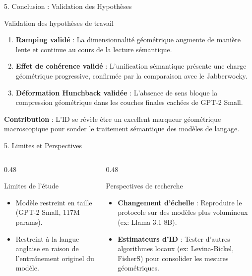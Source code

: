 \documentclass[t, aspectratio=169]{beamer}
\begin{document}
\begin{frame}{5. Conclusion : Validation des Hypothèses}
  \begin{block}{Validation des hypothèses de travail}
    \small
    \begin{enumerate}
      \item \textbf{Ramping validé} : La dimensionnalité géométrique augmente de manière lente et continue au cours de la lecture sémantique.
      \item \textbf{Effet de cohérence validé} : L'unification sémantique présente une charge géométrique progressive, confirmée par la comparaison avec le Jabberwocky.
      \item \textbf{Déformation Hunchback validée} : L'absence de sens bloque la compression géométrique dans les couches finales cachées de GPT-2 Small.
    \end{enumerate}
  \end{block}
  \vspace{0.2cm}
  \begin{center}
    \small \textbf{Contribution} : L'ID se révèle être un excellent marqueur géométrique macroscopique pour sonder le traitement sémantique des modèles de langage.
  \end{center}
\end{frame}

\begin{frame}{5. Limites et Perspectives}
  \begin{columns}[t]
    \begin{column}{0.48\textwidth}
      \begin{block}{Limites de l'étude}
        \small
        \begin{itemize}
          \item Modèle restreint en taille (GPT-2 Small, 117M params).
          \item Restreint à la langue anglaise en raison de l'entraînement originel du modèle.
        \end{itemize}
      \end{block}
    \end{column}
    
    \begin{column}{0.48\textwidth}
      \begin{block}{Perspectives de recherche}
        \small
        \begin{itemize}
          \item \textbf{Changement d'échelle} : Reproduire le protocole sur des modèles plus volumineux (ex: Llama 3.1 8B).
          \item \textbf{Estimateurs d'ID} : Tester d'autres algorithmes locaux (ex: Levina-Bickel, FisherS) pour consolider les mesures géométriques.
        \end{itemize}
      \end{block}
    \end{column}
  \end{columns}
\end{frame}

\lastframe%
\end{document}
